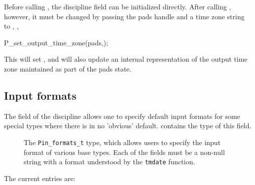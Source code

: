 Before calling , the discipline field 
can be initialized directly.  After calling , however, it
must be changed by passing the pads handle and a time zone string to 
, \eg{},

\begin{centercode}
    P\_set\_output\_time\_zone(pads,);
\end{centercode}

This will set , and will also update
an internal representation of the output time zone maintained as part of
the pads state.

\subsection{Input formats}
\label{sec:library-customization-input-formats}
The  field of the discipline allows one to specify
default input formats for some special types where there is 
in no 'obvious' default.  contains the type
of this field.
\begin{figure}
\caption{The \texttt{Pin\_formats\_t} type, which allows users to specify the
  input format of various \pads{} base types. Each of the fields must
  be a non-null string with a format understood by the \texttt{tmdate} function.}
\label{fig:input-formats}
\end{figure}
The current entries are:

